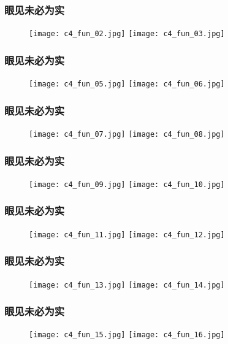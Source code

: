 \begin{frame}
  \frametitle{眼见未必为实}
  \begin{figure}
    \centering
    \texttt{[image: c4\_fun\_02.jpg]}\quad
    \texttt{[image: c4\_fun\_03.jpg]}
  \end{figure}
\end{frame}

\begin{frame}
  \frametitle{眼见未必为实}
  \begin{figure}
    \centering
    \texttt{[image: c4\_fun\_05.jpg]}\quad
    \texttt{[image: c4\_fun\_06.jpg]}
  \end{figure}
\end{frame}

\begin{frame}
  \frametitle{眼见未必为实}
  \begin{figure}
    \centering
    \texttt{[image: c4\_fun\_07.jpg]}\quad
    \texttt{[image: c4\_fun\_08.jpg]}
  \end{figure}
\end{frame}

\begin{frame}
  \frametitle{眼见未必为实}
  \begin{figure}
    \centering
    \texttt{[image: c4\_fun\_09.jpg]}\quad
    \texttt{[image: c4\_fun\_10.jpg]}
  \end{figure}
\end{frame}

\begin{frame}
  \frametitle{眼见未必为实}
  \begin{figure}
    \centering
    \texttt{[image: c4\_fun\_11.jpg]}\quad
    \texttt{[image: c4\_fun\_12.jpg]}
  \end{figure}
\end{frame}

\begin{frame}
  \frametitle{眼见未必为实}
  \begin{figure}
    \centering
    \texttt{[image: c4\_fun\_13.jpg]}\quad
    \texttt{[image: c4\_fun\_14.jpg]}
  \end{figure}
\end{frame}

\begin{frame}
  \frametitle{眼见未必为实}
  \begin{figure}
    \centering
    \texttt{[image: c4\_fun\_15.jpg]}\quad
    \texttt{[image: c4\_fun\_16.jpg]}
  \end{figure}
\end{frame}

